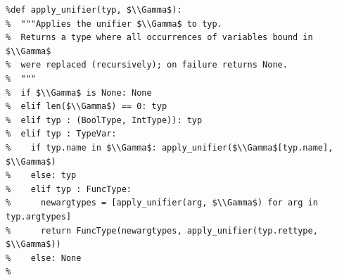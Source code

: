 \documentclass[border=10pt]{standalone}
\begin{document}
\begin{lstlisting}
%def apply_unifier(typ, $\\Gamma$):
%  """Applies the unifier $\\Gamma$ to typ.
%  Returns a type where all occurrences of variables bound in $\\Gamma$
%  were replaced (recursively); on failure returns None.
%  """
%  if $\\Gamma$ is None: None
%  elif len($\\Gamma$) == 0: typ
%  elif typ : (BoolType, IntType)): typ
%  elif typ : TypeVar:
%    if typ.name in $\\Gamma$: apply_unifier($\\Gamma$[typ.name], $\\Gamma$)
%    else: typ
%    elif typ : FuncType:
%      newargtypes = [apply_unifier(arg, $\\Gamma$) for arg in typ.argtypes]
%      return FuncType(newargtypes, apply_unifier(typ.rettype, $\\Gamma$))
%    else: None    
%
\end{lstlisting}
\end{document}
